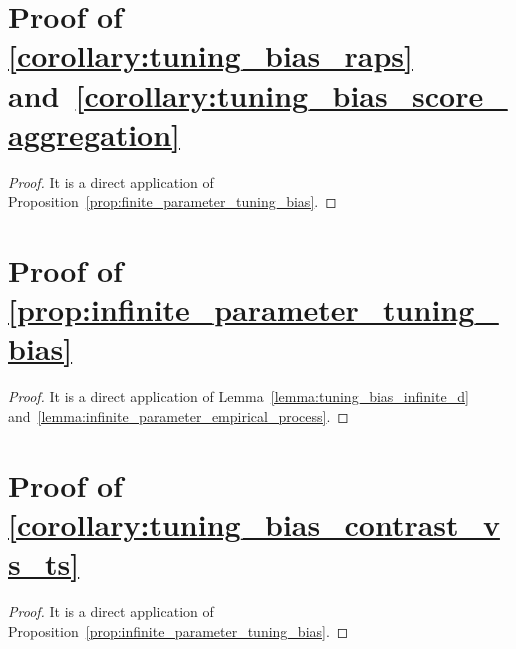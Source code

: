 \documentclass{article}
\newcommand{\1}{\mathbbm{1}}
\theoremstyle{plain}
\theoremstyle{definition}
\theoremstyle{remark}
\begin{document}
\section{Proof of \cref{corollary:tuning_bias_raps} and~\ref{corollary:tuning_bias_score_aggregation}}
\label{sec:proof_tuning_bias_raps_score_aggregation}
\begin{proof}
    It is a direct application of Proposition~\ref{prop:finite_parameter_tuning_bias}.
\end{proof}



\section{Proof of \cref{prop:infinite_parameter_tuning_bias}}
\label{sec:proof_infinite_parameter_tuning_bias}
\begin{proof}
    It is a direct application of Lemma~\ref{lemma:tuning_bias_infinite_d} and~\ref{lemma:infinite_parameter_empirical_process}.
\end{proof}


\section{Proof of \cref{corollary:tuning_bias_contrast_vs_ts}}
\label{sec:proof_tuning_bias_contrast_vs_ts}
\begin{proof}
    It is a direct application of Proposition~\ref{prop:infinite_parameter_tuning_bias}.
\end{proof}
\end{document}
